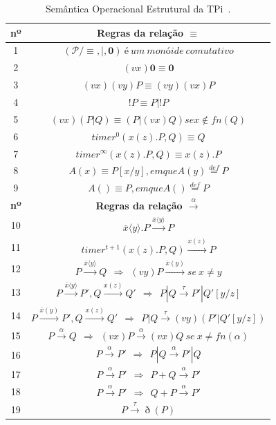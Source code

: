 \begin{table}[!ht]
	\centering\tiny{
		\caption{Semântica Operacional Estrutural da TPi~\cite{aziz2016formal}. \label{tab:tpi_sos}}
\begin{tabular}{|c|c|}
	\hline 
	\textbf{nº} & \textbf{Regras da relação} $\equiv$ \\ 
	\hline 
	1 & $(\mathcal{P}/ \equiv, |, \textbf{0})~é~um~monóide~comutativo$ \\ 
	\hline 
	2 & $(vx)\textbf{0} \equiv \textbf{0}$ \\ 
	\hline 
	3 & $(vx)(vy)P \equiv (vy)(vx)P$ \\ 
	\hline 
	4 & $!P \equiv P|!P$ \\ 
	\hline 
	5 & $(vx)(P|Q) \equiv (P|(vx)Q) se x \notin fn(Q)$ \\ 
	\hline 
	6 & $timer^{0}(x(z).P,Q) \equiv Q$ \\ 
	\hline 
	7 & $timer^{\infty}(x(z).P,Q) \equiv x(z).P$ \\ 
	\hline 
	8 & $A(x) \equiv P[x/y], em que A(y) \stackrel{def}{=} P$ \\ 
	\hline 
	9 & $A() \equiv P, em que A() \stackrel{def}{=} P$ \\ 
	\hline 
	\textbf{nº} & \textbf{Regras da relação $\stackrel{\alpha}{\longrightarrow}$} \\ 
	\hline 
	10 & $\overline{x}\langle y \rangle.P \stackrel{\overline{x}\langle y \rangle}{\longrightarrow} P$ \\ 
	\hline 
	11 & $timer^{t+1}(x(z).P,Q) \stackrel{x(z)}{\longrightarrow} P$ \\ 
	\hline 
	12 & $P \stackrel{\overline{x}\langle y \rangle}{\longrightarrow} Q ~~ \Rightarrow ~~ (vy)P \stackrel{\overline{x}(y)}{\longrightarrow} se~ x \neq y $ \\ 
	\hline 
	13 & $P \stackrel{\overline{x}\langle y \rangle}{\longrightarrow} P', Q \stackrel{x(z)}{\longrightarrow} Q' ~~ \Rightarrow ~~ P|Q \stackrel{\tau}{\longrightarrow} P' | Q'[y/z]$ \\ 
	\hline 
	14 & $P \stackrel{\overline{x}(y)}{\longrightarrow} P', Q \stackrel{x(z)}{\longrightarrow} Q' ~~ \Rightarrow ~~ P|Q \stackrel{\tau}{\longrightarrow} (vy)(P'|Q'[y/z])$ \\ 
	\hline 
	15 & $P \stackrel{\alpha}{\longrightarrow} Q ~~ \Rightarrow ~~ (vx)P \stackrel{\alpha}{\longrightarrow} (vx)Q~se~ x \neq fn(\alpha)$ \\ 
	\hline 
	16 & $P \stackrel{\alpha}{\longrightarrow} P' ~~ \Rightarrow ~~ P|Q \stackrel{\alpha}{\longrightarrow} P'|Q$ \\ 
	\hline 
	17 & $P \stackrel{\alpha}{\longrightarrow} P' ~~ \Rightarrow ~~ P + Q\stackrel{\alpha}{\longrightarrow} P'$ \\ 
	\hline 
	18 & $P \stackrel{\alpha}{\longrightarrow} P' ~~ \Rightarrow ~~ Q + P\stackrel{\alpha}{\longrightarrow} P'$ \\ 
	\hline 
	19 & $P \stackrel{\tau}{\longrightarrow} \eth  (P)$ \\ 
	\hline 
\end{tabular}  
	}
\end{table}


